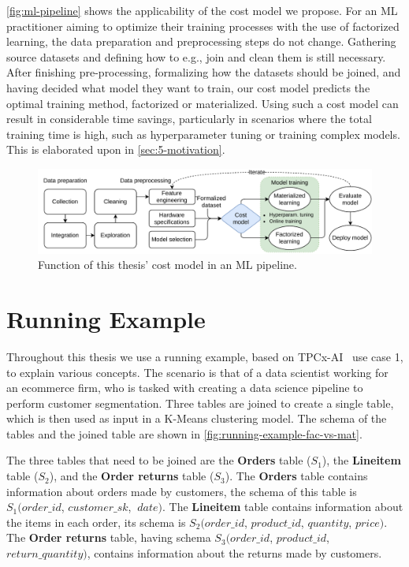 \autoref{fig:ml-pipeline} shows the applicability of the cost model we propose. For an ML practitioner aiming to optimize their training processes with the use of factorized learning, the data preparation and preprocessing steps do not change. Gathering source datasets and defining how to e.g., join and clean them is still necessary. After finishing pre-processing, formalizing how the datasets should be joined, and having decided what model they want to train, our cost model predicts the optimal training method, factorized or materialized. Using such a cost model can result in considerable time savings, particularly in scenarios where the total training time is high,  such as hyperparameter tuning or training complex models. This is elaborated upon in \autoref{sec:5-motivation}.

\begin{figure}[ht]
  \centering
  \includegraphics[width=0.95\linewidth]{chapters/01_introduction/figures/ML-Pipeline.pdf}
  \caption{Function of this thesis' cost model in an ML pipeline.}
  \label{fig:ml-pipeline}
\end{figure}

\section{Running Example}
Throughout this thesis we use a running example, based on TPCx-AI~\cite{tpcx-ai} use case 1, to explain various concepts. The scenario is that of a data scientist working for an ecommerce firm, who is tasked with creating a data science pipeline to perform customer segmentation. Three tables are joined to create a single table, which is then used as input in a K-Means clustering model. The schema of the tables and the joined table are shown in \autoref{fig:running-example-fac-vs-mat}.

The three tables that need to be joined are the \textbf{Orders} table ($S_1$), the \textbf{Lineitem} table ($S_2$), and the \textbf{Order returns} table ($S_3$). The \textbf{Orders} table contains information about orders made by customers, the schema of this table is $S_1(order\_id$, $customer\_sk$, $\ date)$. The \textbf{Lineitem} table contains information about the items in each order, its schema is $S_2(order\_id$, $product\_id$, $quantity$,  $price)$. The \textbf{Order returns} table, having schema $S_3(order\_id$, $product\_id$, $return\_quantity)$, contains information about the returns made by customers.

